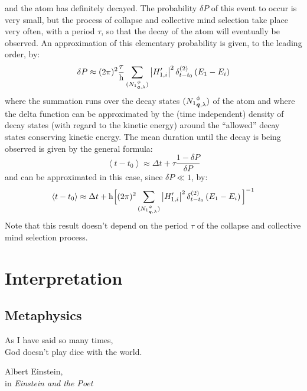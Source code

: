 \documentclass[10pt,a4paper,twoside,openany]{book}
\begin{document}
\begin{flushleft}
\Atom\hspace*{3mm}\DetectorOn\hspace*{3mm}\ObserverOn
\end{flushleft}
and the atom has definitely decayed. The probability $\delta P$ of this event to occur is very small, but the process of collapse and collective mind selection take place very often, with a period $\tau$, so that the decay of the atom will eventually be observed. An approximation of this elementary probability is given, to the leading order, by:
\begin{equation*}
\delta P \approx ( 2 \pi )^2 \frac\tau{\mathrm h} \sum_{({N_1}^{\phi}_{{\boldsymbol{q}}, {\lambda}})} \left| H'_{1,i} \right|^2 \delta^{({2})}_{t - t_0} \left({E_1 - E_i}\right)
\end{equation*}
where the summation runs over the decay states $({N_1}^{\phi}_{{\boldsymbol{q}}, {\lambda}})$ of the atom and where the delta function can be approximated by the (time independent) density of decay states (with regard to the kinetic energy) around the ``allowed'' decay states conserving kinetic energy. The mean duration until the decay is being observed is given by the general formula:
\begin{equation*}
\left< t - t_0 \right> \approx \Delta t + \tau \frac{1 - \delta P}{\delta P}
\end{equation*}
and can be approximated in this case, since $\delta P \ll 1$, by:
\begin{equation*}
\left< t - t_0 \right> \approx \Delta t + \mathrm h \Big[ ( 2 \pi )^2 \sum_{({N_1}^{\phi}_{{\boldsymbol{q}}, {\lambda}})} \left| H'_{1,i} \right|^2 \delta^{({2})}_{t - t_0} \left({E_1 - E_i}\right) \Big]^{-1}
\end{equation*}
Note that this result doesn't depend on the period $\tau$ of the collapse and collective mind selection process.

\part{Interpretation}

\chapter{Metaphysics}
\label{Metaphysics}

\renewcommand{\epigraphwidth}{6cm}
\epigraph{As I have said so many times,\\God doesn't play dice with the world.}{Albert Einstein, \\ in \textit{Einstein and the Poet}~\cite{Hermanns1983}}
\end{document}
